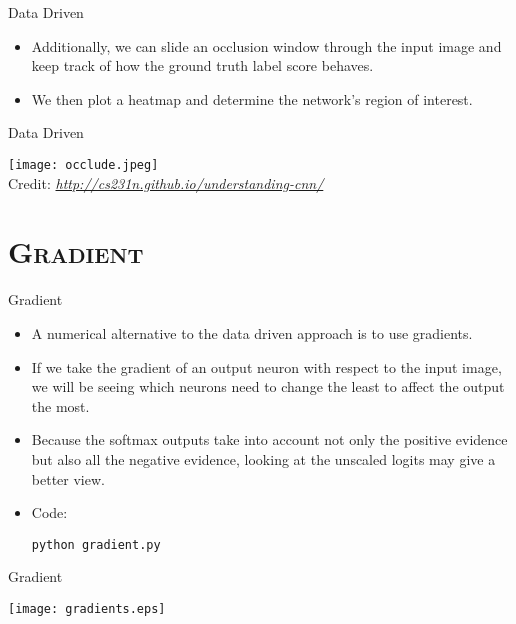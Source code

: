 \begin{frame}{Data Driven}
	\begin{itemize}
		\item Additionally, we can slide an occlusion window through the input image and keep track of how the ground truth label score behaves.
		\item We then plot a heatmap and determine the network's region of interest.
	\end{itemize}
\end{frame}

\begin{frame}{Data Driven}
	\begin{center}
		\texttt{[image: occlude.jpeg]}\\[-1ex]
		{\tiny Credit: {\itshape \url{http://cs231n.github.io/understanding-cnn/}}}
	\end{center}
\end{frame}

\section{\scshape Gradient}
\begin{frame}{Gradient}
	\begin{itemize}
		\item A numerical alternative to the data driven approach is to use gradients.
		\item If we take the gradient of an output neuron with respect to the input image,
		we will be seeing which neurons need to change the least to affect the output the most.
		\item Because the softmax outputs take into account not only the positive evidence but also all the negative evidence, looking at the unscaled logits may give a better view.
		\item<2-> Code:
		\begin{center}
			{\smaller \texttt{python gradient.py}}
		\end{center}
	\end{itemize}
\end{frame}

\begin{frame}{Gradient}
	\begin{center}
		\texttt{[image: gradients.eps]}
	\end{center}
\end{frame}

